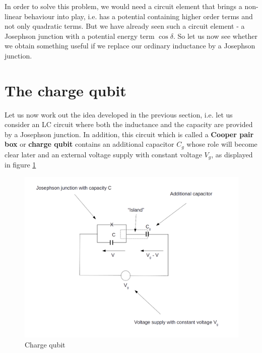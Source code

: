 \documentclass[a4paper, draft]{article}
\theoremstyle{own}
\theoremstyle{remark}
\begin{document}
In order to solve this problem, we would need a circuit element that brings a non-linear behaviour into play, i.e. has a potential containing higher order terms and not only quadratic terms. But we have already seen such a circuit element - a Josephson junction with a potential energy term $\cos \delta$. So let us now see whether we obtain something useful if we replace our ordinary inductance by a Josephson junction. 

\section{The charge qubit}

Let us now work out the idea developed in the previous section, i.e. let us consider an LC circuit where both the inductance and the capacity are provided by a Josephson junction. In addition, this circuit which is called a {\bf Cooper pair box} or {\bf charge qubit} contains an additional capacitor $C_g$ whose role will become clear later and an external voltage supply with constant voltage $V_g$, as displayed in figure \ref{fig:ChargeQubit}

\begin{figure}[ht]
\centering
\includegraphics[width=0.7\linewidth]{images/ChargeQubit}
\caption[Charge qubit]{Charge qubit}
\label{fig:ChargeQubit}
\end{figure}
\end{document}
